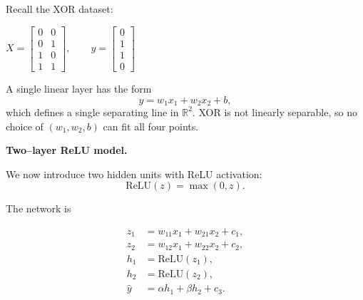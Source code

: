 \medskip

Recall the XOR dataset:

\begin{center}
\noindent
\begin{minipage}{0.3\textwidth}
$
X =
\begin{bmatrix}
0 & 0 \\
0 & 1 \\
1 & 0 \\
1 & 1
\end{bmatrix},
\qquad
y =
\begin{bmatrix}
0 \\
1 \\
1 \\
0
\end{bmatrix}
$
\end{minipage}
\begin{minipage}{0.36\textwidth}
\centering
{}
\end{minipage}
\end{center}

A single linear layer has the form
\[
\hat y = w_1 x_1 + w_2 x_2 + b,
\]
which defines a single separating line in $\mathbb{R}^2$.  
XOR is not linearly separable, so no choice of $(w_1,w_2,b)$ can fit all four points.

\bigskip

\textbf{Two–layer ReLU model.}

We now introduce two hidden units with ReLU activation:
\[
\mathrm{ReLU}(z) = \max(0,z).
\]

The network is

\[
\begin{aligned}
z_1 &= w_{11} x_1 + w_{21} x_2 + c_1, \\
z_2 &= w_{12} x_1 + w_{22} x_2 + c_2, \\
h_1 &= \mathrm{ReLU}(z_1), \\
h_2 &= \mathrm{ReLU}(z_2), \\
\hat y &= \alpha h_1 + \beta h_2 + c_3.
\end{aligned}
\]

